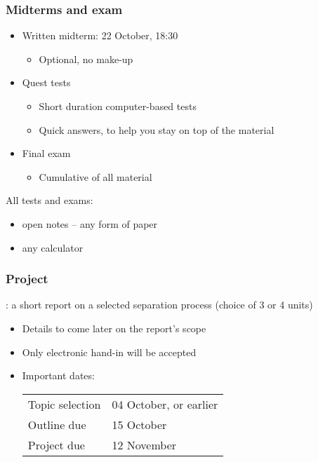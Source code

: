 \begin{frame}\frametitle{Midterms and exam}
	\begin{itemize}
		\item	Written midterm: 22 October, 18:30
		\begin{itemize}
			\item	Optional, no make-up
		\end{itemize}
		
		\item	Quest tests
		\begin{itemize}
			\item	Short duration computer-based tests
			\item	Quick answers, to help you stay on top of the material
		\end{itemize}
		
		\item	Final exam
		\begin{itemize}
			\item	Cumulative of all material
		\end{itemize}		
	\end{itemize}

	\vspace{12pt}
	All tests and exams:
	\begin{itemize}
		\item	open notes -- any form of paper
		\item	any calculator
	\end{itemize}	
\end{frame}

\begin{frame}\frametitle{Project}
	\begin{exampleblock}{}
		\textbf{{\color{myBlue}{AIM}}}: a short report on a selected separation process (choice of 3 or 4 units)
	\end{exampleblock}
	\begin{itemize}
		\item	Details to come later on the report's scope
		\item	Only electronic hand-in will be accepted
		\item	Important dates: 
		
		\vspace{12pt}
		\begin{tabular}{ll}
			Topic selection & 04 October, or earlier\\
			Outline due & 15 October\\
			Project due & 12 November\\
		\end{tabular}
	\end{itemize}
\end{frame}


